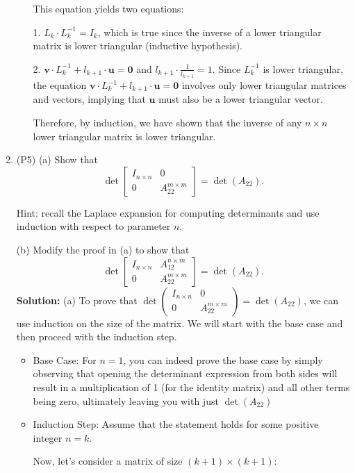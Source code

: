 \documentclass[12pt]{article}
\begin{document}
\begin{enumerate}[leftmargin=\labelsep]
\begin{itemize}
This equation yields two equations:

1. \(L_k \cdot L_k^{-1} = I_k\), which is true since the inverse of a lower triangular matrix is lower triangular (inductive hypothesis).

2. \(\mathbf{v} \cdot L_k^{-1} + l_{k+1} \cdot \mathbf{u} = \mathbf{0}\) and \(l_{k+1} \cdot \frac{1}{l_{k+1}} = 1\). Since \(L_k^{-1}\) is lower triangular, the equation \(\mathbf{v} \cdot L_k^{-1} + l_{k+1} \cdot \mathbf{u} = \mathbf{0}\) involves only lower triangular matrices and vectors, implying that \(\mathbf{u}\) must also be a lower triangular vector.


Therefore, by induction, we have shown that the inverse of any \(n \times n\) lower triangular matrix is lower triangular.
\end{itemize}
\item (P5) (a) Show that
\[
\det
\begin{bmatrix}
I_{n\times n} & 0 \\
0 & A_{22}^{m\times m}
\end{bmatrix}
= \det(A_{22}).
\]

Hint: recall the Laplace expansion for computing determinants and use induction with respect to parameter \(n\).

(b) Modify the proof in (a) to show that
\[
\det
\begin{bmatrix}
I_{n\times n} & A_{12}^{n\times m} \\
0 & A_{22}^{m\times m}
\end{bmatrix}
= \det(A_{22}).
\]
\textbf{Solution:} (a) To prove that $\det\left(\begin{matrix}I_{n\times n} & 0 \\ 0 & A_{22}^{m\times m}\end{matrix}\right) = \det(A_{22})$, we can use induction on the size of the matrix. We will start with the base case and then proceed with the induction step.
\begin{itemize}
	\item Base Case: For $n = 1$, you can indeed prove the base case by simply observing that opening the determinant expression from both sides will result in a multiplication of 1 (for the identity matrix) and all other terms being zero, ultimately leaving you with just $\det(A_{22})$

	\item Induction Step: Assume that the statement holds for some positive integer $n = k$.

Now, let's consider a matrix of size $(k+1)\times (k+1)$:


\end{itemize}
\end{enumerate}
\end{document}
